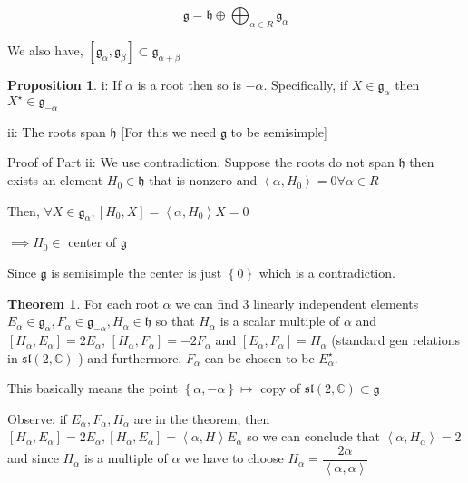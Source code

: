 \documentclass{article}
\theoremstyle{definition}
\newtheorem{theorem}{Theorem}
\newtheorem{proposition}{Proposition}
\begin{document}
\[
    \mathfrak{g} = \mathfrak{h} \oplus \bigoplus_{\alpha \in R}^{} \mathfrak{g}  _\alpha    
\]

We also have, \([\mathfrak{g}_\alpha ,\mathfrak{g}_\beta  ] \subset \mathfrak{g}_{\alpha +\beta } \)  

\begin{proposition}
    i: If \(\alpha\) is a root then so is \(-\alpha\). Specifically, if \(X\in \mathfrak{g}_\alpha \) then \(X^{\star} \in \mathfrak{g} _{-\alpha } \)
    
    ii: The roots span \(\mathfrak{h} \) [For this we need \(\mathfrak{g} \) to be semisimple]

\end{proposition}

Proof of Part ii: We use contradiction. Suppose the roots do not span \(\mathfrak{h} \) then exists an element \(H_0\in \mathfrak{h} \) that is nonzero and \(\left\langle \alpha , H_0 \right\rangle =0 \forall \alpha \in R\) 

Then, \(\forall X\in \mathfrak{g} _\alpha ,[H_0,X] = \left\langle \alpha , H_0 \right\rangle X = 0\)

\(\implies H_0\in\) center of \(\mathfrak{g} \)

Since \(\mathfrak{g} \) is semisimple the center is just \(\left\{ 0 \right\} \) which is a contradiction. 

\begin{theorem}
    For each root \(\alpha \) we can find \(3\) linearly independent elements \(E_\alpha \in \mathfrak{g} _\alpha, F_\alpha \in \mathfrak{g} _{-\alpha}, H_\alpha \in \mathfrak{h} \) so that \(H_\alpha \) is a scalar multiple of \(\alpha \) and \([H_\alpha , E_\alpha ] = 2E_\alpha \), \(\left[ H_\alpha , F_\alpha  \right] = -2F_\alpha \) and \(\left[ E_\alpha ,F_\alpha  \right] = H_\alpha \) (standard gen relations in \(\mathfrak{sl} (2,\mathbb{C} )\) ) and furthermore, \(F_\alpha \) can be chosen to be \(E_\alpha ^{\star} \). 
\end{theorem}

This basically means the point \(\left\{ \alpha ,-\alpha  \right\} \mapsto \) copy of \(\mathfrak{sl} (2,\mathbb{C} ) \subset \mathfrak{g}\)

Observe: if \(E_\alpha ,F_\alpha ,H_\alpha \) are in the theorem, then \([H_\alpha , E_\alpha ] = 2E_\alpha , [H_\alpha , E_\alpha ]=\left\langle \alpha ,H \right\rangle E_\alpha \) so we can conclude that \(\left\langle \alpha ,H_\alpha  \right\rangle = 2\) and since \(H_\alpha \) is a multiple of \(\alpha \) we have to choose \(H_\alpha =\dfrac{2\alpha}{\left\langle \alpha ,\alpha  \right\rangle }\)  
\end{document}
